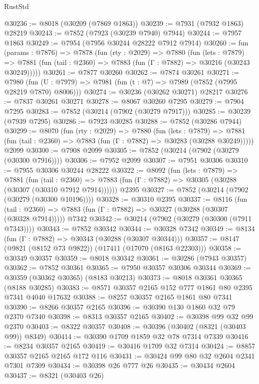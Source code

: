 \begin{lexlean}{RustStd}
\begin{coremodule}
@30236 := @8018 (@30209 (@7869 @1863))
@30239 := @7931 (@7932 @1863) @28219
@30243 := @7852 (@7923 (@30239 @7940) @7944)
@30244 := @7957 @1863
@30249 := @7954 (@7956 @30244 @28222 @7912 @7914)
@30260 := fun (params : @7876) =>
  @7878
    (fun (rty : @2029) =>
    @7880
      (fun (lets : @7879) =>
      @7881 (fun (tail : @2360) => @7883 (fun (Γ : @7882) => @30216 (@30243 @30249)))))
@30261 := @7877 @30260
@30262 := @7874 @30261
@30271 := @7980
    (fun (U : @7979) => @7981 (fun (t : @7) => @7989 (@7852 (@7995 @28219 @7870) @8006)))
@30274 := @30236 (@30262 @30271) @28217
@30276 := @7837 @30261 @30271
@30278 := @8067 @30260 @7295
@30279 := @7904 @7295
@30283 := @7852 (@30214 (@7902 (@30279 @7917)))
@30285 := @30239 (@7939 @7295)
@30286 := @7923 @30285
@30288 := @7852 (@30286 @7944)
@30299 := @8070
    (fun (rty : @2029) =>
    @7880
      (fun (lets : @7879) =>
      @7881 (fun (tail : @2360) => @7883 (fun (Γ : @7882) => @30283 (@30288 @30249)))))
    @2099
@30300 := @7908 @2099
@30305 := @7852 (@30214 (@7902 (@30279 (@30300 @7916))))
@30306 := @7952 @2099
@30307 := @7951 @30306
@30310 := @7955 @30306 @30244 @28222
@30322 := @8092
    (fun (lets : @7879) =>
    @7881
      (fun (tail : @2360) =>
      @7883 (fun (Γ : @7882) => @30305 (@30288 (@30307 (@30310 @7912 @7914))))))
    @2395
@30327 := @7852 (@30214 (@7902 (@30279 (@30300 @10196))))
@30328 := @30310 @2395
@30337 := @8116
    (fun (tail : @2360) => @7883 (fun (Γ : @7882) => @30327 (@30288 (@30307 (@30328 @7914)))))
    @7342
@30342 := @30214 (@7902 (@30279 (@30300 (@7911 @7343))))
@30343 := @7852 @30342
@30344 := @30328 @7342
@30349 := @8134 (fun (Γ : @7882) => @30343 (@30288 (@30307 @30344)))
@30357 := @8147 (@9821 (@8152 @73 @9822)) (@17411 (@17070 (@8163 @22303)))
@30358 := @30349 @30357
@30359 := @8018 @30342
@30361 := @30286 (@7943 @30357)
@30362 := @7852 @30361
@30365 := @7950 @30357 @30306 @30344
@30369 := @30359 (@30362 @30365) (@8183 @30213)
@30373 := @8018 @30361 @30365 (@8188 @30285)
@30383 := @8571 @30357 @2165 @152 @777 @1861 @80 @2395 @7341 @4040 @17632
@30388 := @8257 @30357 @2165 @1861 @80 @7341
@30390 := @8266 @30357 @2165
@30396 := @30390 @130 @1860 @32 @79 @2370 @7340
@30398 := @8313 @30357 @2165
@30402 := @30398 @99 @32 @99 @2370
@30403 := @8322 @30357
@30408 := @30396 (@30402 (@8321 (@30403 @99)) @8349)
@30414 := @30390 @1709 @1859 @32 @78 @7314 @7339
@30416 := @8234 @30357 @2165
@30419 := @30416 @1709 @32 @7314
@30424 := @8857 @30357 @2165 @2165 @172 @116
@30431 := @30424 @99 @80 @32 @2604 @2341 @7301 @7309
@30434 := @30398 @26 @777 @26
@30435 := @30434 @2604
@30437 := @8321 (@30403 @26)

\end{coremodule}
\end{lexlean}

